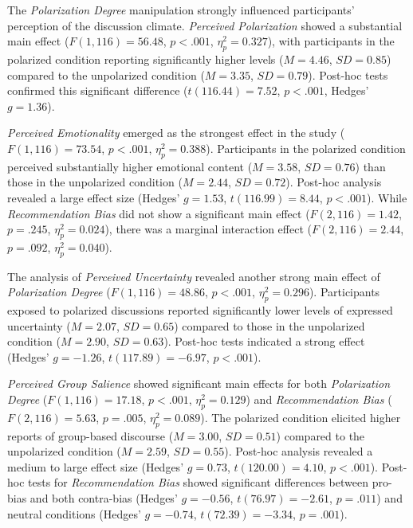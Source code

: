 The \emph{Polarization Degree} manipulation strongly influenced participants' perception of the discussion climate. \emph{Perceived Polarization} showed a substantial main effect ($F(1, 116) = 56.48$, $p < .001$, $\eta_p^2 = 0.327$), with participants in the polarized condition reporting significantly higher levels ($M = 4.46$, $SD = 0.85$) compared to the unpolarized condition ($M = 3.35$, $SD = 0.79$). Post-hoc tests confirmed this significant difference ($t(116.44) = 7.52$, $p < .001$, Hedges' $g = 1.36$).

\emph{Perceived Emotionality} emerged as the strongest effect in the study ($F(1, 116) = 73.54$, $p < .001$, $\eta_p^2 = 0.388$). Participants in the polarized condition perceived substantially higher emotional content ($M = 3.58$, $SD = 0.76$) than those in the unpolarized condition ($M = 2.44$, $SD = 0.72$). Post-hoc analysis revealed a large effect size (Hedges' $g = 1.53$, $t(116.99) = 8.44$, $p < .001$). While \emph{Recommendation Bias} did not show a significant main effect ($F(2, 116) = 1.42$, $p = .245$, $\eta_p^2 = 0.024$), there was a marginal interaction effect ($F(2, 116) = 2.44$, $p = .092$, $\eta_p^2 = 0.040$).

The analysis of \emph{Perceived Uncertainty} revealed another strong main effect of \emph{Polarization Degree} ($F(1, 116) = 48.86$, $p < .001$, $\eta_p^2 = 0.296$). Participants exposed to polarized discussions reported significantly lower levels of expressed uncertainty ($M = 2.07$, $SD = 0.65$) compared to those in the unpolarized condition ($M = 2.90$, $SD = 0.63$). Post-hoc tests indicated a strong effect (Hedges' $g = -1.26$, $t(117.89) = -6.97$, $p < .001$).

\emph{Perceived Group Salience} showed significant main effects for both \emph{Polarization Degree} ($F(1, 116) = 17.18$, $p < .001$, $\eta_p^2 = 0.129$) and \emph{Recommendation Bias} ($F(2, 116) = 5.63$, $p = .005$, $\eta_p^2 = 0.089$). The polarized condition elicited higher reports of group-based discourse ($M = 3.00$, $SD = 0.51$) compared to the unpolarized condition ($M = 2.59$, $SD = 0.55$). Post-hoc analysis revealed a medium to large effect size (Hedges' $g = 0.73$, $t(120.00) = 4.10$, $p < .001$). Post-hoc tests for \emph{Recommendation Bias} showed significant differences between pro-bias and both contra-bias (Hedges' $g = -0.56$, $t(76.97) = -2.61$, $p = .011$) and neutral conditions (Hedges' $g = -0.74$, $t(72.39) = -3.34$, $p = .001$).

